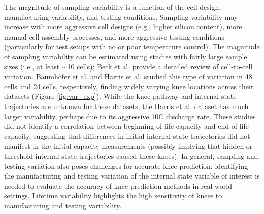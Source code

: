 \documentclass[journal=jpclcd,manuscript=article]{achemso}
\begin{document}
The magnitude of sampling variability is a function of the cell design, manufacturing variability, and testing conditions. Sampling variability may increase with more aggressive cell designs (e.g., higher silicon content), more manual cell assembly processes, and more aggressive testing conditions (particularly for test setups with no or poor temperature control). The magnitude of sampling variability can be estimated using studies with fairly large sample sizes (i.e., at least $\sim$10 cells)\cite{dechent_estimation_2021}; Beck et al.\cite{beck_inhomogeneities_2021} provide a detailed review of cell-to-cell variation. Baumhöfer et al.\cite{baumhofer_production_2014} and Harris et al.\cite{harris_failure_2017} studied this type of variation in 48 cells and 24 cells, respectively, finding widely varying knee locations across their datasets (Figure \ref{fig:var_exp}).
While the knee pathway and internal state trajectories are unknown for these datasets, the Harris et al.\cite{harris_failure_2017} dataset has much larger variability, perhaps due to its aggressive 10C discharge rate.
These studies did not identify a correlation between beginning-of-life capacity and end-of-life capacity, suggesting that differences in initial internal state trajectories did not manifest in the initial capacity measurements (possibly implying that hidden or threshold internal state trajectories caused these knees). In general, sampling and testing variation also poses challenges for accurate knee prediction; identifying the manufacturing and testing variation of the internal state variable of interest is needed to evaluate the accuracy of knee prediction methods in real-world settings.
Lifetime variability highlights the high sensitivity of knees to manufacturing and testing variability.
\end{document}
